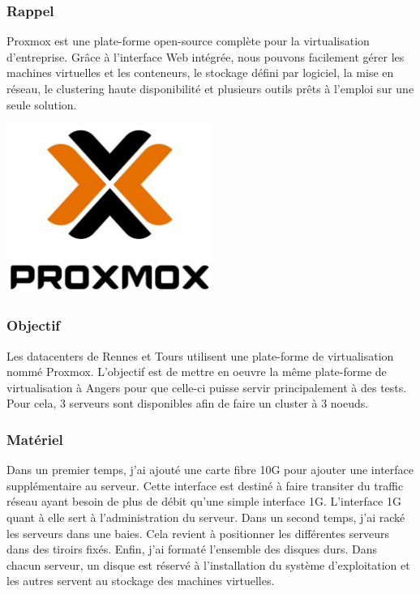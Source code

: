 \documentclass[12pt]{article}
\begin{document}
\subsubsection{Rappel}
\noindent%
\begin{minipage}{.7\textwidth}%
Proxmox est une plate-forme open-source complète pour la virtualisation d'entreprise. 
Grâce à l'interface Web intégrée, nous pouvons facilement gérer les machines virtuelles et les conteneurs, le stockage défini par logiciel, la mise en réseau, le clustering haute disponibilité et plusieurs outils prêts à l'emploi sur une seule solution.

\end{minipage}%
\hfill
\begin{minipage}{.3\textwidth}%
\begin{center}
\includegraphics[width=0.5\textwidth]{src/proxmox.JPG}
\end{center}
\end{minipage}%


\subsubsection{Objectif}
Les datacenters de Rennes et Tours utilisent une plate-forme de virtualisation nommé Proxmox. 
L'objectif est de mettre en oeuvre la même plate-forme de virtualisation à Angers pour que celle-ci puisse servir principalement à des tests. 
Pour cela, 3 serveurs sont disponibles afin de faire un cluster à 3 noeuds.

\subsubsection{Matériel}
Dans un premier temps, j'ai ajouté une carte fibre 10G pour ajouter une interface supplémentaire au serveur. 
Cette interface est destiné à faire transiter du traffic réseau ayant besoin de plus de débit qu'une simple interface 1G. 
L'interface 1G quant à elle sert à l'administration du serveur.
Dans un second temps, j'ai racké les serveurs dans une baies. 
Cela revient à positionner les différentes serveurs dans des tiroirs fixés.
Enfin, j'ai formaté l'ensemble des disques durs.
 Dans chacun serveur, un disque est réservé à l'installation du système d'exploitation et les autres servent au stockage des machines virtuelles.
\end{document}
